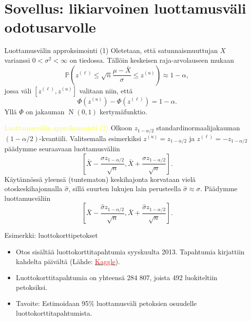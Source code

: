 \documentclass{beamer}
\DeclareMathOperator{\n}{\mathrm N}
\begin{document}

\section{Sovellus: likiarvoinen luottamusväli odotusarvolle}


\begin{frame}{Luottamusvälin approksimointi (1)}
  Oletetaan, että satunnaismuuttujan $X$ varianssi $0 < \sigma^2 < \infty$ on
  tiedossa. Tällöin keskeisen raja-arvolauseen mukaan
  \begin{equation*}
    \mathbb{P}\left(z^{(\ell)} \leq \sqrt{n}\frac{\mu - \bar X}{\sigma}
    \leq z^{(u)}\right) \approx 1 - \alpha,
  \end{equation*}
  \pause
  jossa väli $[z^{(\ell)}, z^{(u)}]$ valitaan niin, että
  \begin{equation*}
    \Phi(z^{(u)}) - \Phi(z^{(\ell)}) = 1-\alpha.
  \end{equation*}
  Yllä $\Phi$ on jakauman $\n\left(0,1\right)$ kertymäfunktio.
\end{frame}


\begin{frame}{\textcolor{yellow}{Luottamusvälin approksimointi (2)}}
  Olkoon $z_{1-\alpha/2}$ standardinormaalijakauman $(1-\alpha/2)$-kvantiili.
  Valitsemalla esimerkiksi $z^{(u)} = z_{1 - \alpha/2}$ ja $z^{(\ell)} = -z_{1 -
  \alpha/2}$ päädymme seuraavaan luottamusväliin
  \begin{equation*}
    \left[\bar X - \frac{\sigma z_{1 - \alpha/2}}{\sqrt{n}},
    \bar X + \frac{\sigma z_{1 - \alpha/2}}{\sqrt{n}}\right].
  \end{equation*}
  \pause
  Käytännössä yleensä (tuntematon) keskihajonta korvataan vielä
  otoskeskihajonnalla $\hat\sigma$, sillä suurten lukujen lain perusteella
  $\hat\sigma\approx\sigma$. Päädymme luottamusväliin
  \begin{equation*}
    \left[\bar X - \frac{\hat\sigma z_{1 - \alpha/2}}{\sqrt{n}},
    \bar X + \frac{\hat\sigma z_{1 - \alpha/2}}{\sqrt{n}}\right].
  \end{equation*}
\end{frame}


\begin{frame}{Esimerkki: luottokorttipetokset}
  \begin{itemize}
    \item Otos sisältää luottokorttitapahtumia syyskuulta 2013. Tapahtumia
    kirjattiin kahdelta päivältä
    (Lähde: \href{https://www.kaggle.com/datasets/mlg-ulb/creditcardfraud?resource=download}{\textcolor{red}{Kaggle}}).
    \pause
    \item Luottokorttitapahtumia on yhteensä 284 807, joista 492 luokiteltiin
    petoksiksi.
    \pause
    \item Tavoite: Estimoidaan 95\% luottamusväli petoksien osuudelle
    luottokorttitapahtumista.
  \end{itemize}
\end{frame}
\end{document}
